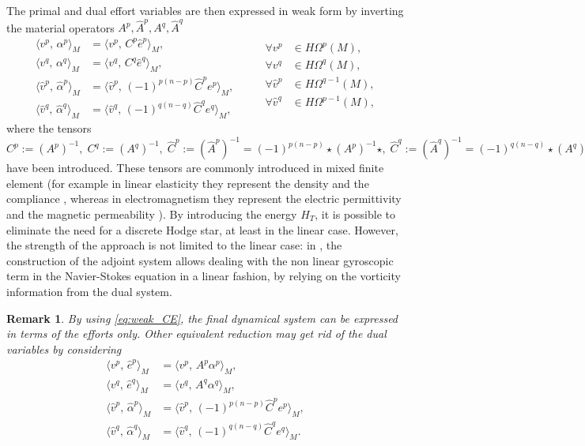 \documentclass{elsarticle}
\newtheorem{remark}{Remark}
\newcommand*{\dual}[1]{\ensuremath{\widehat{#1}}}
\newcommand{\inpr}[3][]{\ensuremath{\langle #2, \, #3 \rangle_{#1}}}
\begin{document}
The primal and dual effort variables are then expressed in weak form by inverting the material operators $A^p, \dual{A}^p, A^q, \dual{A}^q$
\begin{equation}\label{eq:weak_CE}
     \begin{aligned}
     \inpr[M]{{v}^p}{\alpha^p} &= \inpr[M]{{v}^p}{C^p \dual{e}^p}, \\
      \inpr[M]{{v}^q}{\alpha^q} &= \inpr[M]{{v}^q}{C^q \dual{e}^q}, \\
      \inpr[M]{\dual{v}^p}{\dual{\alpha}^p} &= \inpr[M]{\dual{v}^p}{(-1)^{p(n-p)} \dual{C}^p e^p}, \\
      \inpr[M]{\dual{v}^q}{\dual{\alpha}^q} &= \inpr[M]{\dual{v}^q}{(-1)^{q(n-q)} \dual{C}^q e^q}, 
     \end{aligned} \qquad 
     \begin{aligned}
     \forall v^p &\in H\Omega^p(M), \\
     \forall v^q &\in H\Omega^q(M), \\
     \forall \dual{v}^p &\in H\Omega^{q-1}(M), \\
     \forall \dual{v}^q &\in H\Omega^{p-1}(M), \\
     \end{aligned}
\end{equation}
where the tensors $C^p:= (A^p)^{-1}, \; C^q := (A^q)^{-1}, \; \dual{C}^p :=(\dual{A}^p)^{-1} = (-1)^{p(n-p)}\star (A^p)^{-1} \star, \; \dual{C}^q := (\dual{A}^q)^{-1} = (-1)^{q(n-q)}\star (A^q)^{-1} \star$ have been introduced. These tensors are commonly introduced in mixed finite element (for example in linear elasticity they represent the density and the compliance \cite{arnold2014weak}, whereas in electromagnetism they represent the electric permittivity and the magnetic permeability \cite{asad2019maxwell}). By introducing the energy $H_T$, it is possible to eliminate the need for a discrete Hodge star, at least in the linear case. However, the strength of the approach is not limited to the linear case: in \cite{zhang2021mass}, the construction of the adjoint system allows dealing with the non linear gyroscopic term in the Navier-Stokes equation in a linear fashion, by relying on the vorticity information from the dual system. 

\begin{remark}\label{rmk:dualelimination}
By using \eqref{eq:weak_CE}, the final dynamical system can  be expressed in terms of the efforts only. Other equivalent reduction may get rid of the dual variables by considering
\begin{equation*}
     \begin{aligned}
     \inpr[M]{{v}^p}{\dual{e}^p} &= \inpr[M]{{v}^p}{A^p\alpha^p}, \\
      \inpr[M]{{v}^q}{\dual{e}^q} &= \inpr[M]{{v}^q}{A^q\alpha^q}, \\
      \inpr[M]{\dual{v}^p}{\dual{\alpha}^p} &= \inpr[M]{\dual{v}^p}{(-1)^{p(n-p)} \dual{C}^p e^p}, \\
      \inpr[M]{\dual{v}^q}{\dual{\alpha}^q} &= \inpr[M]{\dual{v}^q}{(-1)^{q(n-q)} \dual{C}^q e^q}.
     \end{aligned}
\end{equation*}
\end{remark}
\end{document}
